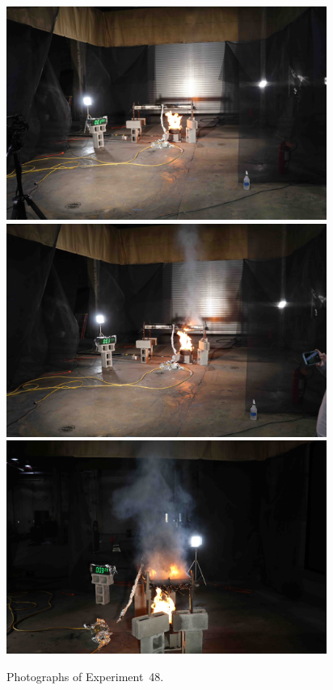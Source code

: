\begin{figure}[p]
\centering
\includegraphics[height=2.75in]{../FIGURES/Test_48_1_min_3_s} \\
\includegraphics[height=2.75in]{../FIGURES/Test_48_3_min_11_s} \\
\includegraphics[height=2.75in]{../FIGURES/Test_48_3_min_28_s}
\caption[Photographs of Experiment~48]{Photographs of Experiment~48.}
\label{fig:Test_48_photos}
\end{figure}


\clearpage

